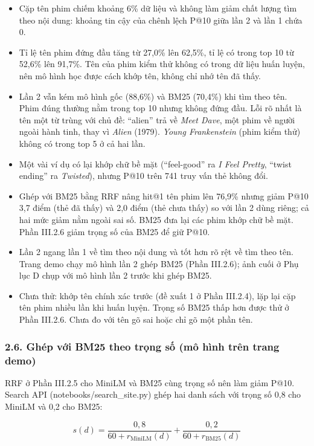 \documentclass[12pt,a4paper]{article}
\providecommand{\tightlist}{\setlength{\itemsep}{0pt}\setlength{\parskip}{0pt}}
\let\oldsubsubsection\subsubsection
\renewcommand{\subsubsection}{\Needspace{10\baselineskip}\oldsubsubsection}
\begin{document}
\begin{itemize}
\tightlist
\item Cặp tên phim chiếm khoảng 6\% dữ liệu và không làm giảm chất lượng tìm theo nội dung: khoảng tin cậy của chênh lệch P@10 giữa lần 2 và lần 1 chứa 0.
\item Tỉ lệ tên phim đứng đầu tăng từ 27,0\% lên 62,5\%, tỉ lệ có trong top 10 từ 52,6\% lên 91,7\%. Tên của phim kiểm thử không có trong dữ liệu huấn luyện, nên mô hình học được cách khớp tên, không chỉ nhớ tên đã thấy.
\item Lần 2 vẫn kém mô hình gốc (88,6\%) và BM25 (70,4\%) khi tìm theo tên. Phim đúng thường nằm trong top 10 nhưng không đứng đầu. Lỗi rõ nhất là tên một từ trùng với chủ đề: ``alien'' trả về \emph{Meet Dave}, một phim về người ngoài hành tinh, thay vì \emph{Alien} (1979). \emph{Young Frankenstein} (phim kiểm thử) không có trong top 5 ở cả hai lần.
\item Một vài ví dụ có lại khớp chữ bề mặt (``feel-good'' ra \emph{I Feel Pretty}, ``twist ending'' ra \emph{Twisted}), nhưng P@10 trên 741 truy vấn thẻ không đổi.
\item Ghép với BM25 bằng RRF nâng hit@1 tên phim lên 76,9\% nhưng giảm P@10 3,7 điểm (thẻ đã thấy) và 2,0 điểm (thẻ chưa thấy) so với lần 2 dùng riêng; cả hai mức giảm nằm ngoài sai số. BM25 đưa lại các phim khớp chữ bề mặt. Phần III.2.6 giảm trọng số của BM25 để giữ P@10.
\item Lần 2 ngang lần 1 về tìm theo nội dung và tốt hơn rõ rệt về tìm theo tên. Trang demo chạy mô hình lần 2 ghép BM25 (Phần III.2.6); ảnh cuối ở Phụ lục D chụp với mô hình lần 2 trước khi ghép BM25.
\item Chưa thử: khớp tên chính xác trước (đề xuất 1 ở Phần III.2.4), lặp lại cặp tên phim nhiều lần khi huấn luyện. Trọng số BM25 thấp hơn được thử ở Phần III.2.6. Chưa đo với tên gõ sai hoặc chỉ gõ một phần tên.
\end{itemize}

\subsubsection{2.6. Ghép với BM25 theo trọng số (mô hình trên trang demo)}

RRF ở Phần III.2.5 cho MiniLM và BM25 cùng trọng số nên làm giảm P@10. Search API (notebooks/search\_site.py) ghép hai danh sách với trọng số 0,8 cho MiniLM và 0,2 cho BM25:

\[
s(d)=\frac{0{,}8}{60+r_{\mathrm{MiniLM}}(d)}+\frac{0{,}2}{60+r_{\mathrm{BM25}}(d)}
\]
\end{document}
